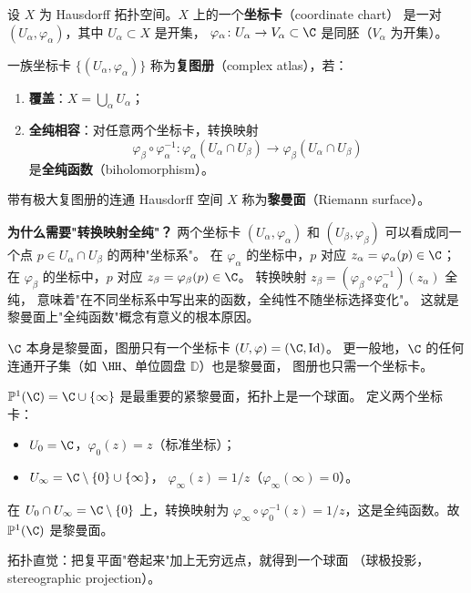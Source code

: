 \begin{definition}[坐标卡与复图册]
\label{def:coordinate-chart}
设 $X$ 为 Hausdorff 拓扑空间。$X$ 上的一个\textbf{坐标卡}（coordinate chart）
是一对 $(U_\alpha, \varphi_\alpha)$，其中 $U_\alpha \subset X$ 是开集，
$\varphi_\alpha\colon U_\alpha \to V_\alpha \subset \C$ 是同胚（$V_\alpha$ 为开集）。

一族坐标卡 $\{(U_\alpha, \varphi_\alpha)\}$ 称为\textbf{复图册}（complex atlas），若：
\begin{enumerate}
  \item \textbf{覆盖}：$X = \bigcup_\alpha U_\alpha$；
  \item \textbf{全纯相容}：对任意两个坐标卡，转换映射
    \[
      \varphi_\beta \circ \varphi_\alpha^{-1}\colon
      \varphi_\alpha(U_\alpha \cap U_\beta) \to \varphi_\beta(U_\alpha \cap U_\beta)
    \]
    是\textbf{全纯函数}（biholomorphism）。
\end{enumerate}
带有极大复图册的连通 Hausdorff 空间 $X$ 称为\textbf{黎曼面}（Riemann surface）。
\end{definition}



\textbf{为什么需要"转换映射全纯"？}
两个坐标卡 $(U_\alpha, \varphi_\alpha)$ 和 $(U_\beta, \varphi_\beta)$
可以看成同一个点 $p \in U_\alpha \cap U_\beta$ 的两种"坐标系"。
在 $\varphi_\alpha$ 的坐标中，$p$ 对应 $z_\alpha = \varphi_\alpha(p) \in \C$；
在 $\varphi_\beta$ 的坐标中，$p$ 对应 $z_\beta = \varphi_\beta(p) \in \C$。
转换映射 $z_\beta = (\varphi_\beta \circ \varphi_\alpha^{-1})(z_\alpha)$ 全纯，
意味着"在不同坐标系中写出来的函数，全纯性不随坐标选择变化"。
这就是黎曼面上"全纯函数"概念有意义的根本原因。

\begin{example}
\label{ex:C-is-riemann-surface}
$\C$ 本身是黎曼面，图册只有一个坐标卡 $(U, \varphi) = (\C, \mathrm{Id})$。
更一般地，$\C$ 的任何连通开子集（如 $\HH$、单位圆盘 $\mathbb{D}$）也是黎曼面，
图册也只需一个坐标卡。
\end{example}

\begin{example}
\label{ex:riemann-sphere}
$\mathbb{P}^1(\C) = \C \cup \{\infty\}$ 是最重要的紧黎曼面，拓扑上是一个球面。
定义两个坐标卡：
\begin{itemize}
  \item $U_0 = \C$，$\varphi_0(z) = z$（标准坐标）；
  \item $U_\infty = \C \setminus \{0\} \cup \{\infty\}$，
    $\varphi_\infty(z) = 1/z$（$\varphi_\infty(\infty) = 0$）。
\end{itemize}
在 $U_0 \cap U_\infty = \C \setminus \{0\}$ 上，转换映射为
$\varphi_\infty \circ \varphi_0^{-1}(z) = 1/z$，这是全纯函数。故 $\mathbb{P}^1(\C)$ 是黎曼面。

拓扑直觉：把复平面"卷起来"加上无穷远点，就得到一个球面
（球极投影，stereographic projection）。
\end{example}

